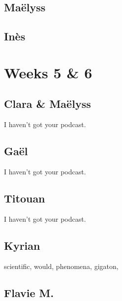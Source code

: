 \documentclass[12pt,oneside]{report}
\begin{document}
\begin{spacing}{1.2}
\color{blue}

\color{black}

\subsection*{Maëlyss}

\color{blue}

\color{black}

\subsection*{Inès}

\color{blue}

\color{black}






\section{Weeks 5 \& 6}

\subsection*{Clara \& Maëlyss}

\color{blue}
I haven't got your podcast.
\color{black}

\subsection*{Gaël}

\color{blue}
I haven't got your podcast.
\color{black}

\subsection*{Titouan}

\color{blue}
I haven't got your podcast.
\color{black}

\subsection*{Kyrian}

scientific, would, phenomena, gigaton, 

\color{blue}

\color{black}

\subsection*{Flavie M.}


\end{spacing}
\end{document}
